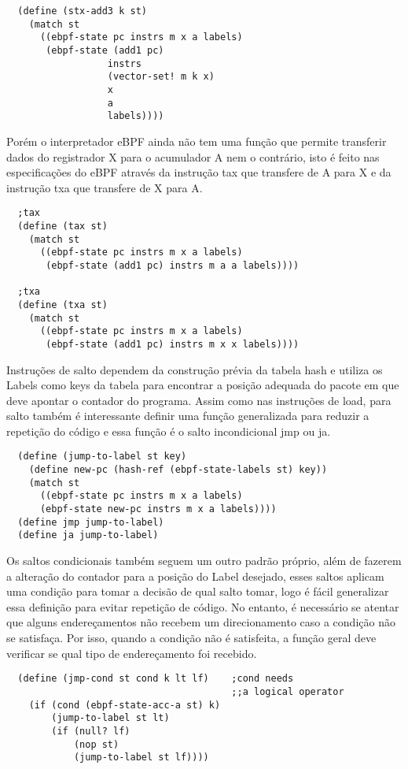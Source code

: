 \documentclass[paper=a4, fontsize=12pt]{article}
\theoremstyle{definition}
\begin{document}
\begin{lstlisting}
  (define (stx-add3 k st)
    (match st
      ((ebpf-state pc instrs m x a labels)
       (ebpf-state (add1 pc)
                  instrs
                  (vector-set! m k x)
                  x
                  a
                  labels))))
\end{lstlisting}

Porém o interpretador eBPF ainda não tem uma função que permite transferir dados do registrador X para o
acumulador A nem o contrário, isto é feito nas especificações do eBPF através da instrução tax que transfere
de A para X e da instrução txa que transfere de X para A.

\begin{lstlisting}
  ;tax
  (define (tax st)
    (match st
      ((ebpf-state pc instrs m x a labels)
       (ebpf-state (add1 pc) instrs m a a labels))))
  
  ;txa
  (define (txa st)
    (match st
      ((ebpf-state pc instrs m x a labels)
       (ebpf-state (add1 pc) instrs m x x labels))))  
\end{lstlisting}

Instruções de salto dependem da construção prévia da tabela hash e utiliza os Labels como keys da tabela
para encontrar a posição adequada do pacote em que deve apontar o contador do programa. Assim como nas
instruções de load, para salto também é interessante definir uma função generalizada para reduzir a repetição
do código e essa função é o salto incondicional jmp ou ja.

\begin{lstlisting}
  (define (jump-to-label st key)
    (define new-pc (hash-ref (ebpf-state-labels st) key))
    (match st
      ((ebpf-state pc instrs m x a labels)
      (ebpf-state new-pc instrs m x a labels))))
  (define jmp jump-to-label)
  (define ja jump-to-label)
\end{lstlisting}

Os saltos condicionais também seguem um outro padrão próprio, além de fazerem a alteração do contador para
a posição do Label desejado, esses saltos aplicam uma condição para tomar a decisão de qual salto tomar, logo
é fácil generalizar essa definição para evitar repetição de código. No entanto, é necessário se atentar que
alguns endereçamentos não recebem um direcionamento caso a condição não se satisfaça. Por isso, quando a condição
não é satisfeita, a função geral deve verificar se qual tipo de endereçamento foi recebido.

\begin{lstlisting}
  (define (jmp-cond st cond k lt lf)    ;cond needs 
                                        ;;a logical operator 
    (if (cond (ebpf-state-acc-a st) k)
        (jump-to-label st lt)
        (if (null? lf)
            (nop st)
            (jump-to-label st lf))))
\end{lstlisting}
\end{document}
